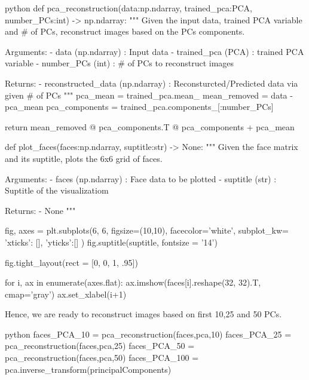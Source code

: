 \documentclass[12pt]{amsart}
\begin{document}
\begin{mintedbox}{python}
def pca_reconstruction(data:np.ndarray,
                       trained_pca:PCA,
                       number_PCs:int) -> np.ndarray:
    """
        Given the input data, trained PCA variable and # of PCs, reconstruct images based on the PCs components.
            
        Arguments:
            - data (np.ndarray) : Input data
            - trained_pca (PCA) : trained PCA variable
            - number_PCs (int)  : # of PCs to reconstruct images
            
        Returns:
            - reconstructed_data (np.ndarray) : Reconsturcted/Predicted data via given # of PCs
    """
    pca_mean = trained_pca.mean_ 
    mean_removed = data - pca_mean
    pca_components = trained_pca.components_[:number_PCs]
    
    return mean_removed @ pca_components.T @ pca_components + pca_mean

def plot_faces(faces:np.ndarray,
               suptitle:str) -> None:
    """
        Given the face matrix and its suptitle, plots the 6x6 grid of faces.
        
        Arguments:
            - faces       (np.ndarray) : Face data to be plotted
            - suptitle    (str)        : Suptitle of the visualizatiom
            
        Returns:
            - None
    """
    
    fig, axes = plt.subplots(6, 6, 
                             figsize=(10,10),
                             facecolor='white',
                             subplot_kw= {
                                 'xticks': [],
                                 'yticks':[]
                             }
    )
    fig.suptitle(suptitle,
                 fontsize = '14')
                 
    fig.tight_layout(rect = [0, 0, 1, .95])
    
    for i, ax in enumerate(axes.flat):
        ax.imshow(faces[i].reshape(32, 32).T, cmap='gray')
        ax.set_xlabel(i+1)
\end{mintedbox}

Hence, we are ready to reconstruct images based on first 10,25 and 50 PCs.
\begin{mintedbox}{python}
faces_PCA_10 = pca_reconstruction(faces,pca,10)
faces_PCA_25 = pca_reconstruction(faces,pca,25)
faces_PCA_50 = pca_reconstruction(faces,pca,50)
faces_PCA_100 = pca.inverse_transform(principalComponents)
\end{mintedbox}
\end{document}
